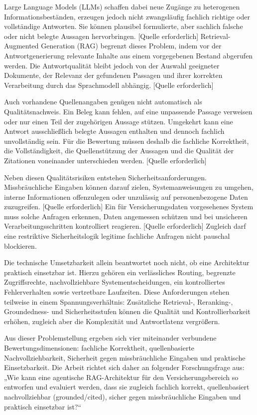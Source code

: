 Large Language Models (LLMs) schaffen dabei neue Zugänge zu heterogenen Informationsbeständen, erzeugen jedoch nicht zwangsläufig fachlich richtige oder vollständige Antworten. Sie können plausibel formulierte, aber sachlich falsche oder nicht belegte Aussagen hervorbringen. [Quelle erforderlich] Retrieval-Augmented Generation (RAG) begrenzt dieses Problem, indem vor der Antwortgenerierung relevante Inhalte aus einem vorgegebenen Bestand abgerufen werden. Die Antwortqualität bleibt jedoch von der Auswahl geeigneter Dokumente, der Relevanz der gefundenen Passagen und ihrer korrekten Verarbeitung durch das Sprachmodell abhängig. [Quelle erforderlich]

Auch vorhandene Quellenangaben genügen nicht automatisch als Qualitätsnachweis. Ein Beleg kann fehlen, auf eine unpassende Passage verweisen oder nur einen Teil der zugehörigen Aussage stützen. Umgekehrt kann eine Antwort ausschließlich belegte Aussagen enthalten und dennoch fachlich unvollständig sein. Für die Bewertung müssen deshalb die fachliche Korrektheit, die Vollständigkeit, die Quellenstützung der Aussagen und die Qualität der Zitationen voneinander unterschieden werden. [Quelle erforderlich]

Neben diesen Qualitätsrisiken entstehen Sicherheitsanforderungen. Missbräuchliche Eingaben können darauf zielen, Systemanweisungen zu umgehen, interne Informationen offenzulegen oder unzulässig auf personenbezogene Daten zuzugreifen. [Quelle erforderlich] Ein für Versicherungsdaten vorgesehenes System muss solche Anfragen erkennen, Daten angemessen schützen und bei unsicheren Verarbeitungsschritten kontrolliert reagieren. [Quelle erforderlich] Zugleich darf eine restriktive Sicherheitslogik legitime fachliche Anfragen nicht pauschal blockieren.

Die technische Umsetzbarkeit allein beantwortet noch nicht, ob eine Architektur praktisch einsetzbar ist. Hierzu gehören ein verlässliches Routing, begrenzte Zugriffsrechte, nachvollziehbare Systementscheidungen, ein kontrolliertes Fehlerverhalten sowie vertretbare Laufzeiten. Diese Anforderungen stehen teilweise in einem Spannungsverhältnis: Zusätzliche Retrieval-, Reranking-, Groundedness- und Sicherheitsstufen können die Qualität und Kontrollierbarkeit erhöhen, zugleich aber die Komplexität und Antwortlatenz vergrößern.

Aus dieser Problemstellung ergeben sich vier miteinander verbundene Bewertungsdimensionen: fachliche Korrektheit, quellenbasierte Nachvollziehbarkeit, Sicherheit gegen missbräuchliche Eingaben und praktische Einsetzbarkeit. Die Arbeit richtet sich daher an folgender Forschungsfrage aus: „Wie kann eine agentische RAG-Architektur für den Versicherungsbereich so entworfen und evaluiert werden, dass sie zugleich fachlich korrekt, quellenbasiert nachvollziehbar (grounded/cited), sicher gegen missbräuchliche Eingaben und praktisch einsetzbar ist?“

